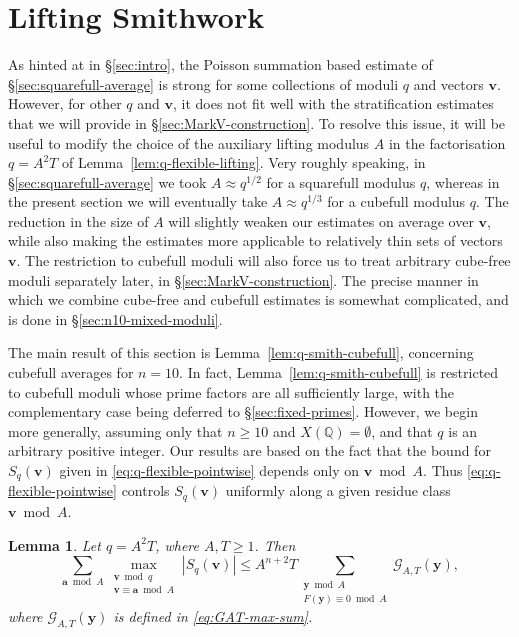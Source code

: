 \documentclass[a4paper,11pt, twoside,reqno]{amsart}
\theoremstyle{plain}
\newtheorem{lemma}[thm]{Lemma}
\theoremstyle{definition}
\theoremstyle{remark}
\newcommand{\F}{\mathbb{F}}
\newcommand{\bfa}{\bm{a}}
\newcommand{\bfv}{\bm{v}}
\newcommand{\bfy}{\bm{y}}
\newcommand{\QQ}{\mathbb{Q}}
\renewcommand{\leq}{\leqslant}
\renewcommand{\ge}{\geqslant}
\numberwithin{equation}{section}
\begin{document}
\section{Lifting Smithwork}
\label{sec:smith-work}

As hinted at in \S\ref{sec:intro},
the Poisson summation based estimate of \S\ref{sec:squarefull-average}
is strong for some collections of moduli $q$ and vectors $\bfv$.
However, for other $q$ and $\bfv$,
it does not fit well with the stratification estimates
that we will provide in \S\ref{sec:MarkV-construction}.
To resolve this issue, it will be useful to
modify the choice of the auxiliary lifting modulus $A$
in the factorisation $q = A^2T$ of Lemma~\ref{lem:q-flexible-lifting}.
Very roughly speaking,
in \S\ref{sec:squarefull-average} we took $A\approx q^{1/2}$ for a squarefull modulus $q$,
whereas in the present section we will
eventually take $A\approx q^{1/3}$ for a cubefull modulus $q$.
The reduction in the size of $A$
will slightly weaken our estimates on average over $\bfv$,
while also making the estimates
more applicable to relatively thin sets of vectors $\bfv$.
The restriction to cubefull moduli will also force us to  treat
arbitrary cube-free moduli separately later, in \S\ref{sec:MarkV-construction}.
The precise manner in which
we combine cube-free and cubefull estimates
is somewhat complicated,
and is done in \S\ref{sec:n10-mixed-moduli}.

The main result of this section is Lemma~\ref{lem:q-smith-cubefull},
concerning cubefull averages for $n=10$.
In fact, Lemma~\ref{lem:q-smith-cubefull}
is restricted to cubefull moduli
whose prime factors are all sufficiently large,
with the complementary case being deferred to \S\ref{sec:fixed-primes}.
However, we begin more generally,
assuming only that $n\ge 10$ and $X(\QQ)=\emptyset$,
and that $q$ is an arbitrary positive integer.
Our results are based on the fact that
the bound for $S_q(\bfv)$ given in
\eqref{eq:q-flexible-pointwise} depends only on $\bfv\bmod{A}$.
Thus \eqref{eq:q-flexible-pointwise} controls $S_q(\bfv)$
uniformly along a given residue class $\bfv\bmod{A}$.

\begin{lemma}
\label{lem:q-flexible-average}
Let $q = A^2T$, where $A,T\ge 1$.
Then
\begin{equation}
\sum_{\bfa\bmod{A}}
\max_{\substack{\bfv\bmod{q} \\ \bfv\equiv \bfa\bmod{A}}} |S_q(\bfv)|
\leq
A^{n+2}T
\sum_{\substack{\bfy\bmod A\\F(\bfy)\equiv0\bmod A}}
\mathcal G_{A,T}(\bfy),
\label{eq:q-flexible-average}
\end{equation}
where $\mathcal G_{A,T}(\bfy)$ is defined in \eqref{eq:GAT-max-sum}.
\end{lemma}
\end{document}
